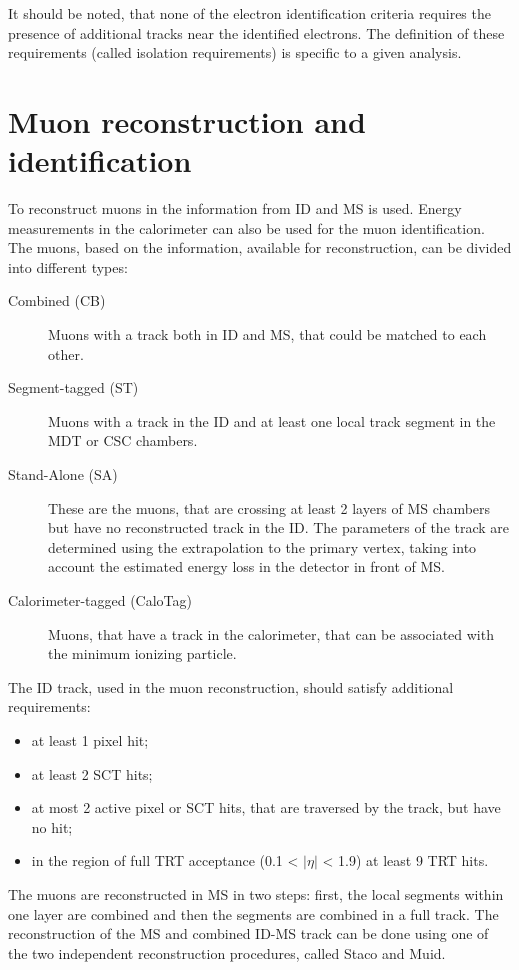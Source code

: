 It should be noted, that none of the electron identification criteria requires the presence of additional tracks near the identified electrons. The definition of these requirements (called isolation requirements) is specific to a given analysis. 

\section{Muon reconstruction and identification}\label{sec:MuonRec}

To reconstruct muons in \atlas the information from ID and MS  is used. Energy measurements in the calorimeter can also be used for the muon identification. The muons, based on the information, available for reconstruction, can be divided into different types:
\begin{description}
\item[Combined (CB)] Muons with a track both in ID and MS, that could be matched to each other. 
\item[Segment-tagged (ST)] Muons with a track in the ID and at least one local track segment in the MDT or CSC chambers. 
\item[Stand-Alone (SA)] These are the muons, that are crossing at least 2 layers of MS chambers but have no reconstructed track in the ID. The parameters of the track are determined using the extrapolation to the primary vertex, taking into account the estimated energy loss in the detector in front of MS. 
\item[Calorimeter-tagged (CaloTag)]  Muons, that have a track in the calorimeter, that can be associated with the minimum ionizing particle.
\end{description}

The ID track, used in the muon reconstruction, should satisfy additional requirements:
\begin{itemize}
\item  at least 1 pixel hit;
\item at least 2 SCT hits;
\item at most 2 active pixel or SCT hits, that are traversed by the track, but have no hit;
\item in the region of full TRT acceptance (0.1 < $|\eta|$ < 1.9) at least 9 TRT hits.
\end{itemize}

The muons are reconstructed in MS in two steps: first, the local segments within one layer are combined and then the segments are combined in a full track. The reconstruction of the MS and combined ID-MS track can be done using one of the two independent reconstruction procedures, called Staco and Muid\cite{AtlasPerf}.  

